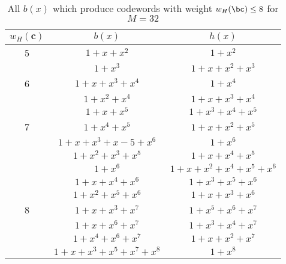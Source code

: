 \begin{table*}[h!]
 \caption{All $b(x)$ which produce codewords with weight $w_H(\bc) \leq 8$ for $M=32$}
\centering
 \begin{tabular}{c c c} 
 \hline
 $w_H(\textbf{c})$ & $b(x)$ & $h(x)$ \\ [0.5ex] 
 \hline\hline
 5 &  $1+x+x^2$ & $1+x^2$\\ 
 \hline 
  & $1+x^3$ &  $1+x+x^2+x^3$ \\
   6 &  $1+x+x^3+x^4$ & $1+x^4$ \\
  \hline 
  & $1+x^2+x^4$ & $1+x+x^3+x^4$ \\
  &  $1+x+x^5$ & $1+x^3+x^4+x^5$ \\
 7 & $1+x^4+x^5$ & $1+x+x^2+x^5$\\ 
  &  $1+x+x^3+x-5+x^6$ & $1+x^6$ \\ 
  \hline
  &$1+x^2+x^3+x^5$ & $1+x+x^4+x^5$ \\
  & $1+x^6$ & $1+x+x^2+x^4+x^5+x^6$\\
  & $1 +x +x^4+x^6$ & $1+x^3+x^5+x^6$ \\
  & $1 +x^2 +x^5 +x^6$ & $1+x+x^3+x^6$\\
  8 & $1+x+x^3+x^7$ & $1+x^5+x^6+x^7$ \\
  & $1+ x+x^6+x^7$ & $1+x^3+x^4+x^7$\\
  & $1+x^4+x^6+x^7$ & $1+x+x^2+x^7$\\
  & $1 +x +x^3 +x^5 +x^7 +x^8$ & $1+x^8$\\
 [1ex]
 \hline
 \end{tabular}
 \label{tab3}
\end{table*}